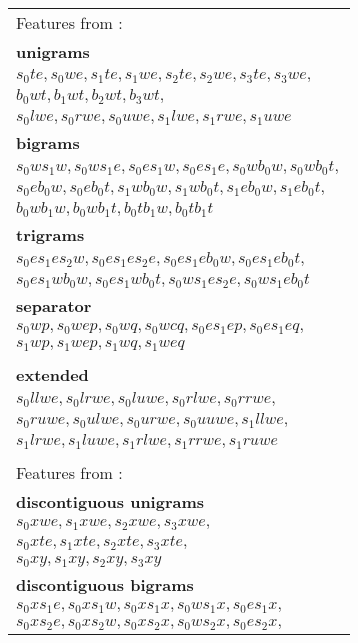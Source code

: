 \documentclass[11pt]{article}
\begin{document}
\begin{figure}
  \begin{adjustbox}{margin=3pt,frame}

\begin{tabular}{>{\small}l}
{Features from \cite{zhang2009transition}:} \\
\textbf{unigrams} \\
$s_0te, s_0we, s_1te, s_1we, s_2te, s_2we, s_3te, s_3we,$ \\
$b_0wt, b_1wt, b_2wt, b_3wt,$ \\
$s_0lwe, s_0rwe, s_0uwe, s_1lwe, s_1rwe, s_1uwe$ \\
\textbf{bigrams} \\
$s_0ws_1w, s_0ws_1e, s_0es_1w, s_0es_1e, s_0wb_0w, s_0wb_0t,$ \\
$s_0eb_0w, s_0eb_0t, s_1wb_0w, s_1wb_0t, s_1eb_0w, s_1eb_0t,$ \\
$b_0wb_1w, b_0wb_1t, b_0tb_1w, b_0tb_1t$ \\
\textbf{trigrams} \\
$s_0es_1es_2w, s_0es_1es_2e, s_0es_1eb_0w, s_0es_1eb_0t,$ \\
$s_0es_1wb_0w, s_0es_1wb_0t, s_0ws_1es_2e, s_0ws_1eb_0t$ \\
\textbf{separator} \\
$s_0wp, s_0wep, s_0wq, s_0wcq, s_0es_1ep, s_0es_1eq,$ \\
$s_1wp, s_1wep, s_1wq, s_1weq$ \\
\\
\textbf{extended} \cite{zhu2013fast} \\
$s_0llwe, s_0lrwe, s_0luwe, s_0rlwe, s_0rrwe,$ \\
$s_0ruwe, s_0ulwe, s_0urwe, s_0uuwe, s_1llwe,$ \\
$s_1lrwe, s_1luwe, s_1rlwe, s_1rrwe, s_1ruwe$ \\
\\
{\footnotesize Features from \cite{maier2015discontinuous}:} \\
\textbf{discontiguous unigrams} \\
$s_0xwe, s_1xwe, s_2xwe, s_3xwe,$ \\
$s_0xte, s_1xte, s_2xte, s_3xte,$ \\
$s_0xy, s_1xy, s_2xy, s_3xy$ \\
\textbf{discontiguous bigrams} \\
$s_0xs_1e, s_0xs_1w, s_0xs_1x, s_0ws_1x, s_0es_1x,$ \\
$s_0xs_2e, s_0xs_2w, s_0xs_2x, s_0ws_2x, s_0es_2x,$ \\

\end{tabular}
\end{adjustbox}
\end{figure}
\end{document}

